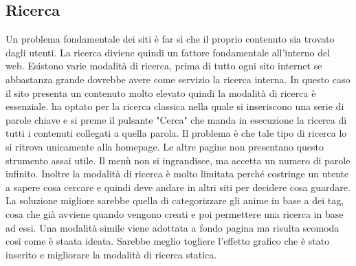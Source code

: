 \subsection{Ricerca} \label{Ricerca}
Un problema fondamentale dei siti è far sì che il proprio contenuto sia trovato dagli utenti. La ricerca diviene quindi un fattore fondamentale all'interno del web. Esistono varie modalità di ricerca, prima di tutto ogni sito internet se abbastanza grande dovrebbe avere come servizio la ricerca interna. In questo caso il sito presenta un contenuto molto elevato quindi la modalità di ricerca è essenziale.
\nomeSito ha optato per la ricerca classica nella quale si inseriscono una serie di parole chiave e si preme il pulsante "Cerca" che manda in esecuzione la ricerca di tutti i contenuti collegati a quella parola.
Il problema è che tale tipo di ricerca lo si ritrova unicamente alla homepage. Le altre pagine non presentano questo strumento assai utile. Il menù non si ingrandisce, ma accetta un numero di parole infinito. Inoltre la modalità di ricerca è molto limitata perché costringe un utente a sapere cosa cercare e quindi deve andare in altri siti per decidere cosa guardare. La soluzione migliore sarebbe quella di categorizzare gli anime in base a dei tag, cosa che già avviene quando vengono creati e poi permettere una ricerca in base ad essi. 
Una modalità simile viene adottata a fondo pagina ma risulta scomoda così come è staata ideata. Sarebbe meglio togliere l'effetto grafico che è stato inserito e migliorare la modalità di ricerca statica.
